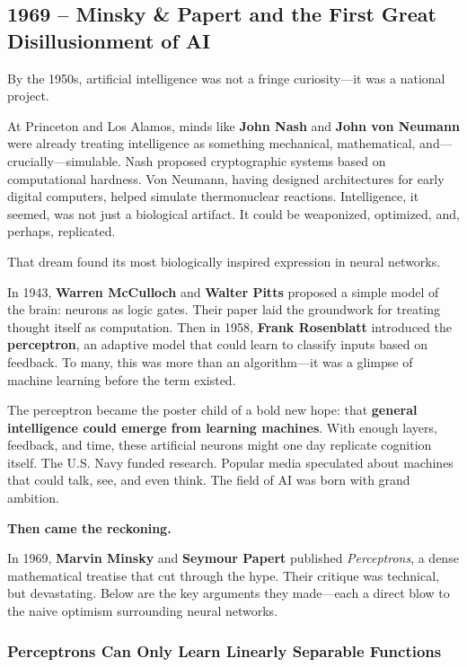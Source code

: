 \subsection{1969 – Minsky \& Papert and the First Great Disillusionment of AI}

By the 1950s, artificial intelligence was not a fringe curiosity—it was a national project.

At Princeton and Los Alamos, minds like \textbf{John Nash} and \textbf{John von Neumann} were already treating intelligence as something mechanical, mathematical, and—crucially—simulable. Nash proposed cryptographic systems based on computational hardness. Von Neumann, having designed architectures for early digital computers, helped simulate thermonuclear reactions. Intelligence, it seemed, was not just a biological artifact. It could be weaponized, optimized, and, perhaps, replicated.

That dream found its most biologically inspired expression in neural networks.

In 1943, \textbf{Warren McCulloch} and \textbf{Walter Pitts} proposed a simple model of the brain: neurons as logic gates. Their paper laid the groundwork for treating thought itself as computation. Then in 1958, \textbf{Frank Rosenblatt} introduced the \textbf{perceptron}, an adaptive model that could learn to classify inputs based on feedback. To many, this was more than an algorithm—it was a glimpse of machine learning before the term existed.

The perceptron became the poster child of a bold new hope: that \textbf{general intelligence could emerge from learning machines}. With enough layers, feedback, and time, these artificial neurons might one day replicate cognition itself. The U.S. Navy funded research. Popular media speculated about machines that could talk, see, and even think. The field of AI was born with grand ambition.

\medskip

\noindent\textbf{Then came the reckoning.}

In 1969, \textbf{Marvin Minsky} and \textbf{Seymour Papert} published \emph{Perceptrons}, a dense mathematical treatise that cut through the hype. Their critique was technical, but devastating. Below are the key arguments they made—each a direct blow to the naive optimism surrounding neural networks.

\subsubsection{Perceptrons Can Only Learn Linearly Separable Functions}

